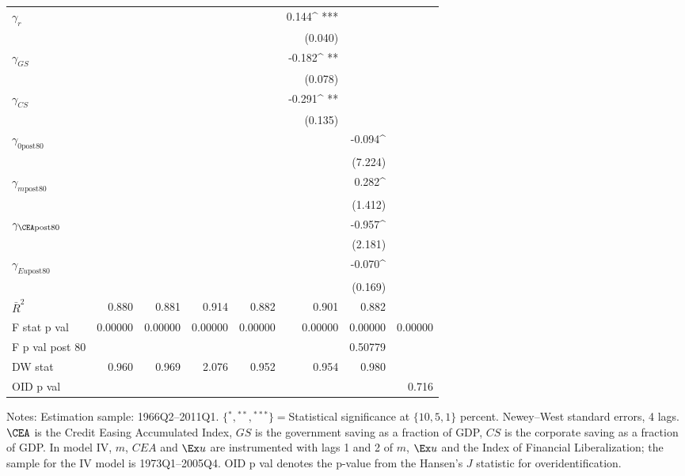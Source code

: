 \begin{table}
\begin{center}
\begin{tabular}{@{}ld{6}d{6}d{6}d{6}d{6}d{6}d{6}@{}}
 $\gamma_{r}$  &   & & & & 0.144^{ ***}  & & \\
 &   &  & & & (0.040)  & & \\
 $\gamma_{GS}$  &   & & & & -0.182^{ **}  & & \\
 &   &  & & & (0.078)  &  & \\
 $\gamma_{CS}$  &   & & & &-0.291^{ **}  & & \\
 &   &  & & & (0.135)  & & \\
 $\gamma_{\text{0post80}}$  &   & & & & &-0.094^{ }  &  \\
 &   &  & & & & (7.224)   & \\
 $\gamma_{m\text{post80}}$  &   & & & & &0.282^{ }  &  \\
 &   &  & &  & &(1.412)  &  \\
 $\gamma_{\CEA\text{post80}}$  &   & & & & &-0.957^{ }  & \\
 &   &  & & & &(2.181)  & \\
 $\gamma_{Eu\text{post80}}$  &   & & & & &-0.070^{ }  &  \\
 &   &  & &  & & (0.169)  &  \\
\midrule
 $\bar{R}^2$  & 0.880  & 0.881  & 0.914  & 0.882  & 0.901  & 0.882  & \\
 F stat p val  & 0.00000  & 0.00000  & 0.00000  & 0.00000  & 0.00000  & 0.00000  & 0.00000\\
 F p val post 80 &  & & & & & 0.50779  &  \\
DW stat  & 0.960  & 0.969  & 2.076  & 0.952  & 0.954  & 0.980 & \\
OID p val &  & & & &  & & 0.716\\
\bottomrule
\end{tabular}
\end{center}
 {\footnotesize Notes: Estimation sample: 1966Q2--2011Q1. $\{{}^*,{}^{**},{}^{***}\}={}$Statistical significance at $\{10,5,1\}$ percent. Newey--West standard errors, 4 lags. $\CEA$ is the Credit Easing Accumulated Index, $GS$ is the government saving as a fraction of GDP, $CS$ is the corporate saving as a fraction of GDP. In model IV, $m$, $CEA$ and $\Ex u$ are instrumented with lags 1 and 2 of $m$, $\Ex u$ and the \cite{abiadEtAl_FinReforms} Index of Financial Liberalization; the sample for the IV model is 1973Q1--2005Q4. OID p val denotes the p-value from the Hansen's $J$ statistic for overidentification.}
\end{table}
